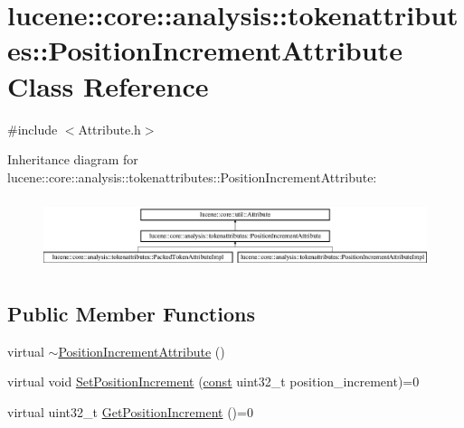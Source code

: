 \hypertarget{classlucene_1_1core_1_1analysis_1_1tokenattributes_1_1PositionIncrementAttribute}{}\section{lucene\+:\+:core\+:\+:analysis\+:\+:tokenattributes\+:\+:Position\+Increment\+Attribute Class Reference}
\label{classlucene_1_1core_1_1analysis_1_1tokenattributes_1_1PositionIncrementAttribute}


{\ttfamily \#include $<$Attribute.\+h$>$}

Inheritance diagram for lucene\+:\+:core\+:\+:analysis\+:\+:tokenattributes\+:\+:Position\+Increment\+Attribute\+:\begin{figure}[H]
\begin{center}
\leavevmode
\includegraphics[height=2.084367cm]{classlucene_1_1core_1_1analysis_1_1tokenattributes_1_1PositionIncrementAttribute}
\end{center}
\end{figure}
\subsection*{Public Member Functions}
\begin{DoxyCompactItemize}
\item 
virtual \mbox{\hyperlink{classlucene_1_1core_1_1analysis_1_1tokenattributes_1_1PositionIncrementAttribute_ab97d9e510cff6c1014c283a59aac531c}{$\sim$\+Position\+Increment\+Attribute}} ()
\item 
virtual void \mbox{\hyperlink{classlucene_1_1core_1_1analysis_1_1tokenattributes_1_1PositionIncrementAttribute_a7d012852b01e0b16da72a911a90266b7}{Set\+Position\+Increment}} (\mbox{\hyperlink{ZlibCrc32_8h_a2c212835823e3c54a8ab6d95c652660e}{const}} uint32\+\_\+t position\+\_\+increment)=0
\item 
virtual uint32\+\_\+t \mbox{\hyperlink{classlucene_1_1core_1_1analysis_1_1tokenattributes_1_1PositionIncrementAttribute_af0c59c3fbf138881647e46f05468eb13}{Get\+Position\+Increment}} ()=0
\end{DoxyCompactItemize}
